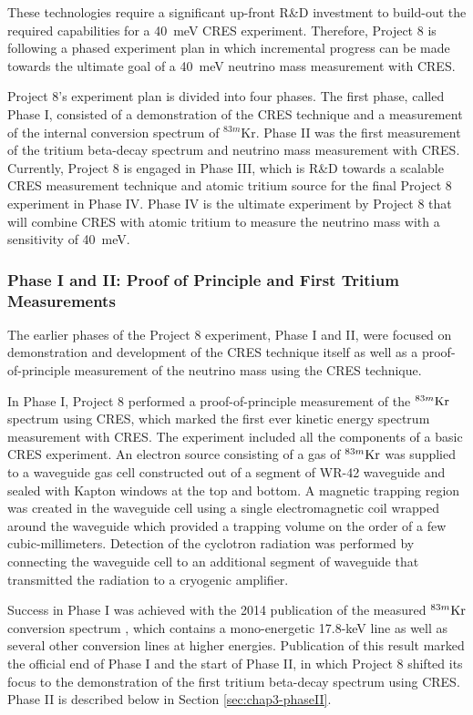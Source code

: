 These technologies require a significant up-front R\&D investment to build-out the required capabilities for a 40~meV CRES experiment. Therefore, Project 8 is following a phased experiment plan in which incremental progress can be made towards the ultimate goal of a 40~meV neutrino mass measurement with CRES.

Project 8's experiment plan is divided into four phases. The first phase, called Phase I, consisted of a demonstration of the CRES technique and a measurement of the internal conversion spectrum of $^{83m}$Kr. Phase II was the first measurement of the tritium beta-decay spectrum and neutrino mass measurement with CRES. Currently, Project 8 is engaged in Phase III, which is R\&D towards a scalable CRES measurement technique and atomic tritium source for the final Project 8 experiment in Phase IV. Phase IV is the ultimate experiment by Project 8 that will combine CRES with atomic tritium to measure the neutrino mass with a sensitivity of 40~meV. 

\subsubsection*{Phase I and II: Proof of Principle and First Tritium Measurements}

The earlier phases of the Project 8 experiment, Phase I and II, were focused on demonstration and development of the CRES technique itself as well as a proof-of-principle measurement of the neutrino mass using the CRES technique.

In Phase I, Project 8 performed a proof-of-principle measurement of the $^{83m}\rm{Kr}$ spectrum using CRES, which marked the first ever kinetic energy spectrum measurement with CRES. The experiment included all the components of a basic CRES experiment. An electron source consisting of a gas of $^{83m}\rm{Kr}$ was supplied to a waveguide gas cell constructed out of a segment of WR-42 waveguide and sealed with Kapton windows at the top and bottom. A magnetic trapping region was created in the waveguide cell using a single electromagnetic coil wrapped around the waveguide which provided a trapping volume on the order of a few cubic-millimeters. Detection of the cyclotron radiation was performed by connecting the waveguide cell to an additional segment of waveguide that transmitted the radiation to a cryogenic amplifier.

Success in Phase I was achieved with the 2014 publication of the measured $^{83m}\rm{Kr}$ conversion spectrum \cite{Project8:2014ivu}, which contains a mono-energetic 17.8-keV line as well as several other conversion lines at higher energies. Publication of this result marked the official end of Phase I and the start of Phase II, in which Project 8 shifted its focus to the demonstration of the first tritium beta-decay spectrum using CRES. Phase II is described below in Section \ref{sec:chap3-phaseII}.


